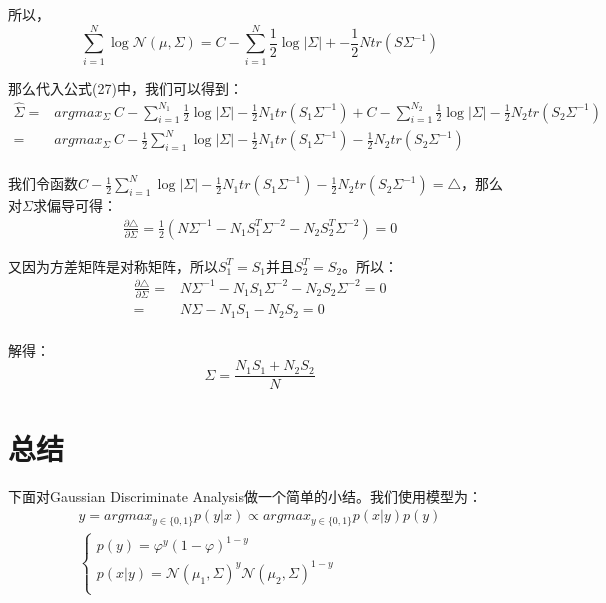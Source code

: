 \documentclass[a4paper]{article}
\begin{document}
所以，
\begin{equation}
    \sum_{i=1}^N \log \mathcal{N}(\mu, \Sigma) = C - \sum_{i=1}^N \frac{1}{2} \log |\Sigma| + -\frac{1}{2}Ntr(S\Sigma^{-1})
\end{equation}

那么代入公式(27)中，我们可以得到：
\begin{equation}
    \begin{split}
        \hat{\Sigma} 
        = & argmax_{\Sigma}\ C - \sum_{i=1}^{N_1} \frac{1}{2} \log |\Sigma| -\frac{1}{2}N_1tr(S_1\Sigma^{-1}) + C - \sum_{i=1}^{N_2} \frac{1}{2} \log |\Sigma| -\frac{1}{2}N_2tr(S_2\Sigma^{-1}) \\
        = & argmax_{\Sigma}\ C  - \frac{1}{2} \sum_{i=1}^N \log |\Sigma| -\frac{1}{2}N_1tr(S_1\Sigma^{-1}) -\frac{1}{2}N_2tr(S_2\Sigma^{-1}) \\
    \end{split}
\end{equation}

我们令函数$C  - \frac{1}{2} \sum_{i=1}^N \log |\Sigma| -\frac{1}{2}N_1tr(S_1\Sigma^{-1}) -\frac{1}{2}N_2tr(S_2\Sigma^{-1}) = \triangle$，那么对$\Sigma$求偏导可得：
\begin{equation}
    \begin{split}
         \frac{\partial \triangle}{\partial \Sigma} = \frac{1}{2} \left( N \Sigma^{-1} - N_1S_1^T\Sigma^{-2} - N_2S_2^T\Sigma^{-2} \right) = 0 
    \end{split}
\end{equation}

又因为方差矩阵是对称矩阵，所以$S_1^T = S_1$并且$S_2^T = S_2$。所以：
\begin{equation}
    \begin{split}
         \frac{\partial \triangle}{\partial \Sigma} = &  N \Sigma^{-1} - N_1S_1\Sigma^{-2} - N_2S_2\Sigma^{-2} = 0 \\
         = & N \Sigma - N_1S_1 - N_2S_2 = 0 \\
    \end{split}
\end{equation}

解得：
\begin{equation}
    \Sigma = \frac{N_1S_1 + N_2S_2}{N}
\end{equation}

\section{总结}
下面对Gaussian Discriminate Analysis做一个简单的小结。我们使用模型为：
\begin{gather}
    \hat{y} = argmax_{y\in \{0,1\}}p(y|x) \propto argmax_{y\in \{0,1\}}p(x|y)p(y) \\ 
    \left\{
        \begin{array}{ll}
            p(y)= \varphi^y(1-\varphi)^{1-y} & \\
            p(x|y)= \mathcal{N}(\mu_1, \Sigma)^y\mathcal{N}(\mu_2, \Sigma)^{1-y} & \\
        \end{array}
    \right.
\end{gather}
\end{document}
